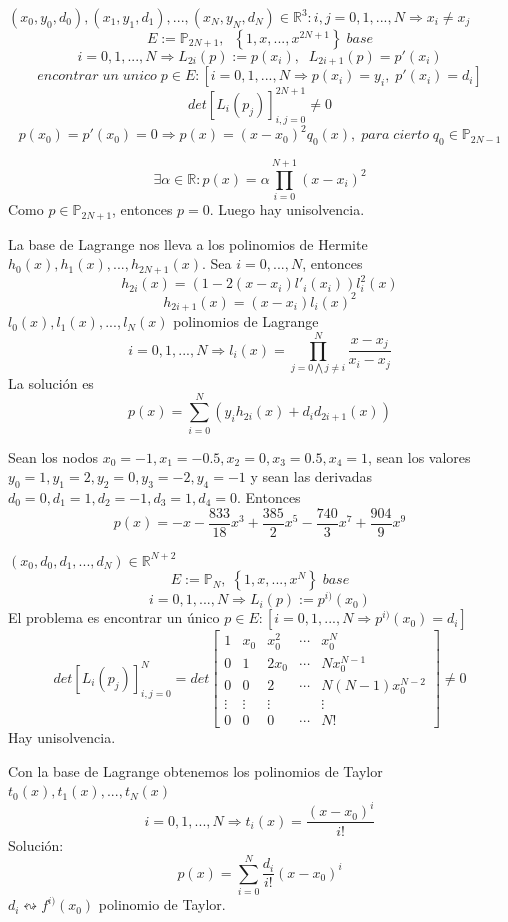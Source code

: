 \begin{nlist}
\item $(x_0,y_0,d_0),(x_1,y_1,d_1),...,(x_N,y_N,d_N) \in \mathbb{R}^3 : i,j=0,1,...,N \Rightarrow x_i \neq x_j $
\[ E := \mathbb{P}_{2N+1}, \; \; \left\lbrace 1,x,...,x^{2N+1} \right\rbrace \; base \]
\[ i = 0,1,...,N \Rightarrow L_{2i}(p) := p(x_i), \; \; L_{2i+1}(p) = p'(x_i) \]
\[ encontrar \; un \; unico \; p \in E : \left[ i = 0,1,...,N \Rightarrow p(x_i)=y_i, \; p'(x_i) = d_i \right] \]
\[ det \left[ L_i(p_j) \right] _{i,j=0}^{2N+1} \neq 0 \]
\[ p(x_0) = p'(x_0) = 0 \Rightarrow p(x)=(x-x_0)^2q_0(x), \; para \; cierto \; q_0 \in \mathbb{P}_{2N-1} \]

\[ \exists \alpha \in \mathbb{R}: p(x) = \alpha \prod_{i=0}^{N+1}(x-x_i)^2 \]
Como $p \in \mathbb{P}_{2N+1}$, entonces $p=0$. Luego hay unisolvencia.

La base de Lagrange nos lleva a los polinomios de Hermite {$h_0(x),h_1(x),...,h_{2N+1}(x)$}.
Sea $i=0,...,N$, entonces
\[ h_{2i}(x)=(1-2(x-x_i)l'_i(x_i))l_i^2(x) \]
\[ h_{2i+1}(x) = (x-x_i)l_i(x)^2 \]
{$l_0(x),l_1(x),...,l_N(x)$} polinomios de Lagrange
\[ i=0,1,...,N \Rightarrow l_i(x) = \prod_{j=0 \bigwedge j\neq i}^N \frac{x-x_j}{x_i-x_j}\]
La solución es
\[p(x) = \sum_{i=0}^N (y_ih_{2i}(x) + d_id_{2i+1}(x)) \]

	\begin{ejemplo}
	Sean los nodos $x_0=-1, x_1=-0.5, x_2=0, x_3=0.5, x_4=1$, sean los valores $y_0=1, y_1=2, y_2=0, y_3=-2, y_4=-1$ y sean las derivadas $d_0=0, d_1=1, d_2=-1, d_3=1, d_4=0$. Entonces
	\[ p(x) = -x - \frac{833}{18}x^3 + \frac{385}{2}x^5 - \frac{740}{3}x^7 + \frac{904}{9}x^9 \]
	\end{ejemplo}

\item $(x_0,d_0,d_1,...,d_N) \in \mathbb{R}^{N+2}$
\[ E:= \mathbb{P}_N, \; \left\lbrace 1,x,...,x^N \right\rbrace \; base \]
\[ i=0,1,...,N \Rightarrow L_i(p) := p^{i)}(x_0) \]
El problema es encontrar un único $p \in E : \left[ i=0,1,...,N \Rightarrow p^{i)}(x_0) = d_i \right] $
\[ det \left[ L_i(p_j) \right] _{i,j=0}^N = det \left[
\begin{array}{ccccc}
1 & x_0 & x_0^2 & \cdots & x_0^N \\
0 & 1 & 2x_0 & \cdots & Nx_0^{N-1} \\
0 & 0 & 2 & \cdots & N(N-1)x_0^{N-2} \\
\vdots & \vdots & \vdots & & \vdots \\
0 & 0 & 0 & \cdots & N!
\end{array}
\right] \neq 0 \]
Hay unisolvencia.

Con la base de Lagrange obtenemos los polinomios de Taylor {$t_0(x),t_1(x),...,t_N(x)$}
\[i=0,1,...,N \Rightarrow t_i(x) = \frac{(x-x_0)^i}{i!} \]
Solución:
\[ p(x) = \sum_{i=0}^N \frac{d_i}{i!}(x-x_0)^i \]
$d_i \leftrightsquigarrow f^{i)}(x_0)$ polinomio de Taylor.

\end{nlist}

